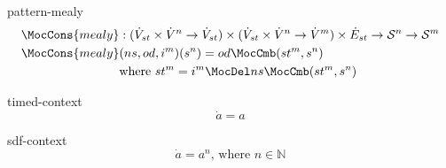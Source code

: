 \documentclass[preview]{standalone}
\begin{document}
\begin{docimage}{pattern-mealy}
  \begin{align*}%
    \MocCons{mealy} &:({\dot{V}_{st} \times  \dot{V}^n \rightarrow \dot{V}_{st}})
                      \times ({\dot{V}_{st} \times \dot{V}^n \rightarrow \dot{V}^m})
                      \times \dot{E}_{st}
                      \rightarrow \mathcal{S}^n \rightarrow \mathcal{S}^m \\
    \MocCons{mealy} &(ns,od,i^m)(s^n) = od \MocCmb (st^m, s^n) \\
                    &\text{where}\ st^m = i^m \MocDel ns \MocCmb (st^m, s^n) 
  \end{align*}
\end{docimage}

\begin{docimage}{timed-context}
  \begin{equation*}%
    \dot{a} = a  
  \end{equation*}
\end{docimage} 

\begin{docimage}{sdf-context}
  \begin{equation*}%
    \dot{a} = a^n \text{, where } n \in \mathbb{N} 
  \end{equation*}
\end{docimage} 
\end{document}
